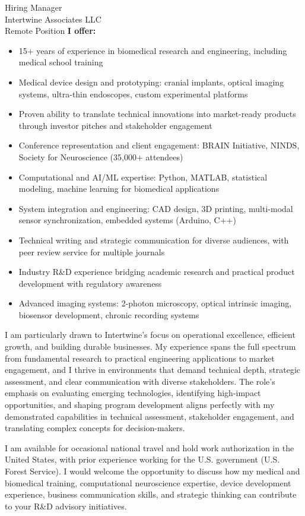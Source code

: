 \documentclass[11pt]{letter}
\begin{document}
\begin{letter}{
Hiring Manager \\
Intertwine Associates LLC \\
Remote Position
}
\textbf{I offer:}
\begin{itemize}
    \item 15+ years of experience in biomedical research and engineering, including medical school training
    \item Medical device design and prototyping: cranial implants, optical imaging systems, ultra-thin endoscopes, custom experimental platforms
    \item Proven ability to translate technical innovations into market-ready products through investor pitches and stakeholder engagement
    \item Conference representation and client engagement: BRAIN Initiative, NINDS, Society for Neuroscience (35,000+ attendees)
    \item Computational and AI/ML expertise: Python, MATLAB, statistical modeling, machine learning for biomedical applications
    \item System integration and engineering: CAD design, 3D printing, multi-modal sensor synchronization, embedded systems (Arduino, C++)
    \item Technical writing and strategic communication for diverse audiences, with peer review service for multiple journals
    \item Industry R\&D experience bridging academic research and practical product development with regulatory awareness
    \item Advanced imaging systems: 2-photon microscopy, optical intrinsic imaging, biosensor development, chronic recording systems
\end{itemize}

\vspace{5mm}I am particularly drawn to Intertwine's focus on operational excellence, efficient growth, and building durable businesses. My experience spans the full spectrum from fundamental research to practical engineering applications to market engagement, and I thrive in environments that demand technical depth, strategic assessment, and clear communication with diverse stakeholders. The role's emphasis on evaluating emerging technologies, identifying high-impact opportunities, and shaping program development aligns perfectly with my demonstrated capabilities in technical assessment, stakeholder engagement, and translating complex concepts for decision-makers.

I am available for occasional national travel and hold work authorization in the United States, with prior experience working for the U.S. government (U.S. Forest Service). I would welcome the opportunity to discuss how my medical and biomedical training, computational neuroscience expertise, device development experience, business communication skills, and strategic thinking can contribute to your R\&D advisory initiatives.


\end{letter}
\end{document}
